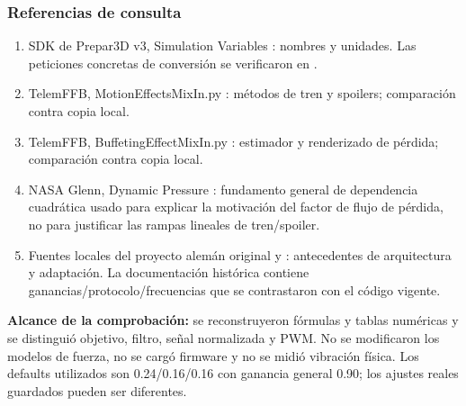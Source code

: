 \subsubsection{Referencias de consulta}
\begin{enumerate}
\item SDK de Prepar3D v3, Simulation Variables \cite{p3dv3}: nombres y unidades. Las peticiones concretas de conversión se verificaron en .
\item TelemFFB, MotionEffectsMixIn.py \cite{telemffb}: métodos de tren y spoilers; comparación contra copia local.
\item TelemFFB, BuffetingEffectMixIn.py \cite{telemffb}: estimador y renderizado de pérdida; comparación contra copia local.
\item NASA Glenn, Dynamic Pressure \cite{nasaq}: fundamento general de dependencia cuadrática usado para explicar la motivación del factor de flujo de pérdida, no para justificar las rampas lineales de tren/spoiler.
\item Fuentes locales del proyecto alemán original \cite{yokealeman} y : antecedentes de arquitectura y adaptación. La documentación histórica contiene ganancias/protocolo/frecuencias que se contrastaron con el código vigente.
\end{enumerate}
\textbf{Alcance de la comprobación:} se reconstruyeron fórmulas y tablas numéricas y se distinguió objetivo, filtro, señal normalizada y PWM. No se modificaron los modelos de fuerza, no se cargó firmware y no se midió vibración física. Los defaults utilizados son 0.24/0.16/0.16 con ganancia general 0.90; los ajustes reales guardados pueden ser diferentes.
\newpage
